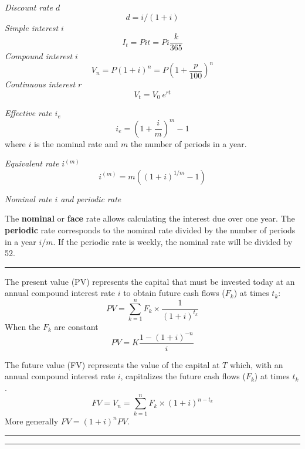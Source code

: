 \begin{f}[Interests]

\emph{Discount rate \(d\)}
     \[d=i/(1+i)\]
\emph{Simple interest \(i\)}
\[
I_t=P i t=P i \frac{k}{365}
\]
\emph{Compound interest \(i\)}
\[
V_n=P(1+i)^n=P\left(1+\frac{p}{100}\right)^n
\]
\emph{Continuous interest \(r\)}
\[V_t=V_0\ e^{rt}\]

\emph{Effective rate \(i_e\)}
\[
i_e=\left( 1+\frac{i}{m}\right) ^{m}-1
\]
where \(i\) is the nominal rate and \(m\) the number of periods in a year.

\emph{Equivalent rate \(i^{(m)}\)}
\[
i^{(m)}=m\left( (1+i)^{1 / m}-1\right) 
\]

\emph{Nominal rate \(i\) and periodic rate}

The \textbf{nominal} or \textbf{face} rate allows calculating the interest due over one year.
The \textbf{periodic} rate corresponds to the nominal rate divided by the number of periods in a year \(i/m\).
If the periodic rate is weekly, the nominal rate will be divided by 52.
\end{f}
\hrule

\begin{f}

The present value (PV) represents the capital that must be invested today at an annual compound interest rate \(i\) to obtain future cash flows (\(F_k\)) at times \(t_k\):
\begin{equation}
	PV = \sum_{k=1}^{n} F_k \times \frac{1}{(1+i)^{t_k}}
\label{ValeurActuelle}
\end{equation}
When the \(F_k\) are constant
\begin{equation}
	PV = K  \frac{1 - (1+i)^{-n}} {i}
\label{ValeurActuelleFluxCt}
\end{equation}

The future value (FV) represents the value of the capital at \(T\) which, with an annual compound interest rate \(i\), capitalizes the future cash flows (\(F_k\)) at times \(t_k\).
\begin{equation}
	FV=V_n = \sum_{k=1}^{n} F_k \times (1+i)^{n-t_k}
\end{equation}
More generally \(FV= (1+i)^{n}PV\).
\end{f}
\hrule

\begin{f}[Annuities]

\end{f}
\hrule

